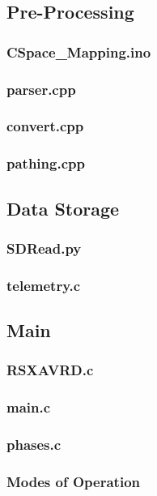\subsection{Pre-Processing}
\subsubsection{CSpace\_Mapping.ino}
\subsubsection{parser.cpp}
\subsubsection{convert.cpp}
\subsubsection{pathing.cpp}
\subsection{Data Storage}
\subsubsection{SDRead.py}
\subsubsection{telemetry.c}
\subsection{Main}
\subsubsection{RSXAVRD.c}
\subsubsection{main.c}
\subsubsection{phases.c}
\subsubsection{Modes of Operation}
